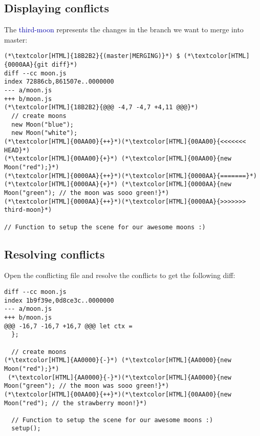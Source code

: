 \subsection{Displaying conflicts}
\begin{frame}[fragile]
  \subslidetitle

  The \textcolor[HTML]{0000AA}{third-moon} represents the changes in the branch
  we want to merge into master:
  \begin{lstlisting}
(*\textcolor[HTML]{18B2B2}{(master|MERGING)}*) $ (*\textcolor[HTML]{0000AA}{git diff}*)
diff --cc moon.js
index 72886cb,861507e..0000000
--- a/moon.js
+++ b/moon.js
(*\textcolor[HTML]{18B2B2}{@@@ -4,7 -4,7 +4,11 @@@}*)
  // create moons
  new Moon("blue");
  new Moon("white");
(*\textcolor[HTML]{00AA00}{++}*)(*\textcolor[HTML]{00AA00}{<<<<<<< HEAD}*)
(*\textcolor[HTML]{00AA00}{+}*) (*\textcolor[HTML]{00AA00}{new Moon("red");}*)
(*\textcolor[HTML]{0000AA}{++}*)(*\textcolor[HTML]{0000AA}{=======}*)
(*\textcolor[HTML]{0000AA}{+}*) (*\textcolor[HTML]{0000AA}{new Moon("green"); // the moon was sooo green!}*)
(*\textcolor[HTML]{0000AA}{++}*)(*\textcolor[HTML]{0000AA}{>>>>>>> third-moon}*)

// Function to setup the scene for our awesome moons :)
\end{lstlisting}
\end{frame}

\subsection{Resolving conflicts}
\begin{frame}[fragile]
  \subslidetitle

  Open the conflicting  file and resolve the conflicts to
  get the following diff:

  \begin{lstlisting}
diff --cc moon.js
index 1b9f39e,0d8ce3c..0000000
--- a/moon.js
+++ b/moon.js
@@@ -16,7 -16,7 +16,7 @@@ let ctx =
  };

  // create moons
(*\textcolor[HTML]{AA0000}{-}*) (*\textcolor[HTML]{AA0000}{new Moon("red");}*)
 (*\textcolor[HTML]{AA0000}{-}*)(*\textcolor[HTML]{AA0000}{new Moon("green"); // the moon was sooo green!}*)
(*\textcolor[HTML]{00AA00}{++}*)(*\textcolor[HTML]{00AA00}{new Moon("red"); // the strawberry moon!}*)

  // Function to setup the scene for our awesome moons :)
  setup();
\end{lstlisting}

\end{frame}

